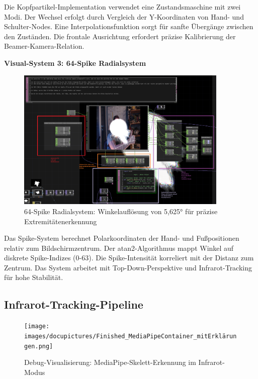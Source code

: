 Die Kopfpartikel-Implementation verwendet eine Zustandsmaschine mit zwei Modi. Der Wechsel erfolgt durch Vergleich der Y-Koordinaten von Hand- und Schulter-Nodes. Eine Interpolationsfunktion sorgt für sanfte Übergänge zwischen den Zuständen. Die frontale Ausrichtung erfordert präzise Kalibrierung der Beamer-Kamera-Relation.

\textbf{Visual-System 3: 64-Spike Radialsystem}

\begin{figure}[h]
    \centering
    \includegraphics[width=0.9\textwidth]{images/docupictures/TopDown_KreisZuRampsParametisierteBerechnungen.png}
    \caption{64-Spike Radialsystem: Winkelauflösung von 5,625° für präzise Extremitätenerkennung}
    \label{fig:spike_system}
\end{figure}

Das Spike-System berechnet Polarkoordinaten der Hand- und Fußpositionen relativ zum Bildschirmzentrum. Der atan2-Algorithmus mappt Winkel auf diskrete Spike-Indizes (0-63). Die Spike-Intensität korreliert mit der Distanz zum Zentrum. Das System arbeitet mit Top-Down-Perspektive und Infrarot-Tracking für hohe Stabilität.

\subsection{Infrarot-Tracking-Pipeline}

\begin{figure}[h]
    \centering
    \texttt{[image: images/docupictures/Finished\_MediaPipeContainer\_mitErklärungen.png]}
    \caption{Debug-Visualisierung: MediaPipe-Skelett-Erkennung im Infrarot-Modus}
    \label{fig:debug_circles}
\end{figure}

